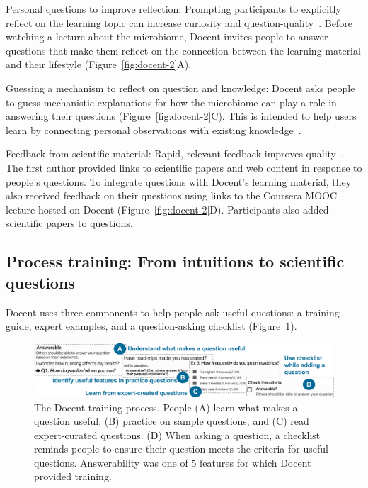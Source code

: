  Personal questions to improve reflection: Prompting participants to explicitly reflect on the learning topic can increase curiosity and question-quality~\cite{Aleven2006, Law2016}. Before watching a lecture about the microbiome, Docent invites people to answer questions that make them reflect on the connection between the learning material and their lifestyle (Figure~\ref{fig:docent-2}A).

Guessing a mechanism to reflect on question and knowledge: Docent asks people to guess mechanistic explanations for how the microbiome can play a role in answering their questions (Figure~\ref{fig:docent-2}C). This is intended to help users learn by connecting personal observations with existing knowledge~\cite{Simon2004}.

Feedback from scientific material: Rapid, relevant feedback improves quality~\cite{Hattie2007}. The first author provided links to scientific papers and web content in response to people’s questions. To integrate questions with Docent’s learning material, they also received feedback on their questions using links to the Coursera MOOC lecture hosted on Docent (Figure~\ref{fig:docent-2}D). Participants also added scientific papers to questions. 

\subsection{Process training: From intuitions to scientific questions}
Docent uses three components to help people ask useful questions: a training guide, expert examples, and a question-asking checklist (Figure~\ref{fig:docent-3}). 

\begin{figure}[b] 
  \centering
  \includegraphics[width=1.0\textwidth]{figures/docent/fig-3.png}
  \caption[The Docent training process]
{The Docent training process. People (A) learn what makes a question useful, (B) practice on sample questions, and (C) read expert-curated questions. (D) When asking a question, a checklist reminds people to ensure their question meets the criteria for useful questions. Answerability was one of 5 features for which Docent provided training.}
  \label{fig:docent-3}
\end{figure}

